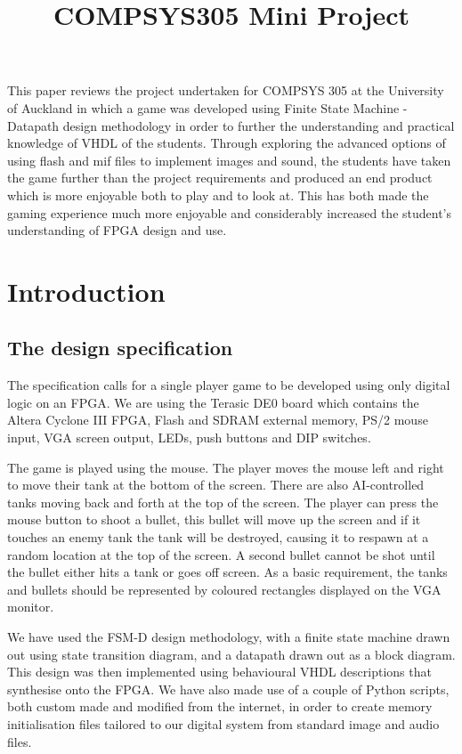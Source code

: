 \documentclass{article}
\title {COMPSYS305 Mini Project}
\begin{document}
\maketitle

\abstract

This paper reviews the project undertaken for COMPSYS 305 at the University of Auckland in which a game was developed using Finite State Machine - Datapath design methodology in order to further the understanding and practical knowledge of VHDL of the students.
Through exploring the advanced options of using flash and mif files to implement images and sound, the students have taken the game further than the project requirements and produced an end product which is more enjoyable both to play and to look at.
This has both made the gaming experience much more enjoyable and considerably increased the student’s understanding of FPGA design and use.

\section{Introduction}

\subsection{The design specification}

The specification calls for a single player game to be developed using only digital logic on an FPGA. We are using the Terasic DE0 board which contains the Altera Cyclone III FPGA, Flash and SDRAM external memory, PS/2 mouse input, VGA screen output, LEDs, push buttons and DIP switches.

The game is played using the mouse. The player moves the mouse left and right to move their tank at the bottom of the screen. There are also AI-controlled tanks moving back and forth at the top of the screen. The player can press the mouse button to shoot a bullet, this bullet will move up the screen and if it touches an enemy tank the tank will be destroyed, causing it to respawn at a random location at the top of the screen. A second bullet cannot be shot until the bullet either hits a tank or goes off screen. As a basic requirement, the tanks and bullets should be represented by coloured rectangles displayed on the VGA monitor.

We have used the FSM-D design methodology, with a finite state machine drawn out using state transition diagram, and a datapath drawn out as a block diagram. This design was then implemented using behavioural VHDL descriptions that synthesise onto the FPGA. We have also made use of a couple of Python scripts, both custom made and modified from the internet, in order to create memory initialisation files tailored to our digital system from standard image and audio files.
\end{document}
